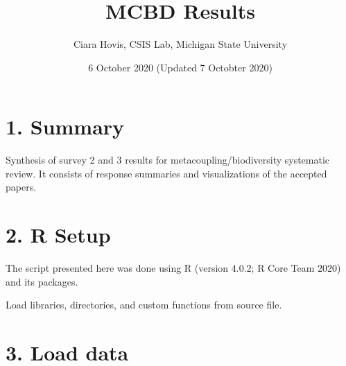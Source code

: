 \documentclass[
]{article}
\title{MCBD Results}
\author{Ciara Hovis, CSIS Lab, Michigan State University}
\date{6 October 2020 (Updated 7 Octobter 2020)}
\begin{document}
\maketitle

{
\setcounter{tocdepth}{4}
\tableofcontents
}
\hypertarget{summary}{%
\section{1. Summary}\label{summary}}

Synthesis of survey 2 and 3 results for metacoupling/biodiversity
systematic review. It consists of response summaries and visualizations
of the accepted papers.

\hypertarget{r-setup}{%
\section{2. R Setup}\label{r-setup}}

The script presented here was done using R (version 4.0.2; R Core Team
2020) and its packages.

Load libraries, directories, and custom functions from source file.

\hypertarget{load-data}{%
\section{3. Load data}\label{load-data}}
\end{document}
